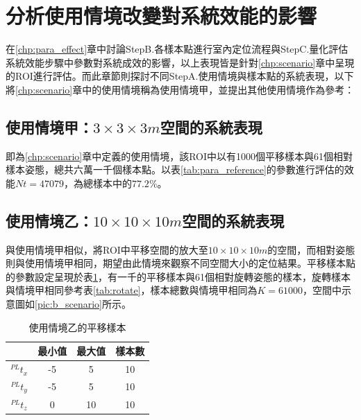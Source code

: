 \section{分析使用情境改變對系統效能的影響}
\label{chp:scene_effect}
在\ref{chp:para_effect}章中討論StepB.各樣本點進行室內定位流程與StepC.量化評估系統效能步驟中參數對系統成效的影響，以上表現皆是針對\ref{chp:scenario}章中呈現的ROI進行評估。而此章節則探討不同StepA.使用情境與樣本點的系統表現，以下將\ref{chp:scenario}章中的使用情境稱為使用情境甲，並提出其他使用情境作為參考：

\subsection{使用情境甲：$3\times 3\times 3m$空間的系統表現}
\label{chp:scene_A}

即為\ref{chp:scenario}章中定義的使用情境，該ROI中以有1000個平移樣本與61個相對樣本姿態，總共六萬一千個樣本點。以表\ref{tab:para_reference}的參數進行評估的效能$Nt=47079$，為總樣本中的$77.2\%$。

\subsection{使用情境乙：$10\times 10\times 10m$空間的系統表現}
\label{chp:scene_B}

與使用情境甲相似，將ROI中平移空間的放大至$10\times 10\times 10m$的空間，而相對姿態則與使用情境甲相同，期望由此情境來觀察不同空間大小的定位結果。平移樣本點的參數設定呈現於表\ref{tab:B_translate}，有一千的平移樣本與61個相對旋轉姿態的樣本，旋轉樣本與情境甲相同參考表\ref{tab:rotate}，樣本總數與情境甲相同為$K=61000$，空間中示意圖如\ref{pic:b_scenario}所示。

\begin{table}[htpb]
    \begin{center}
      \caption{使用情境乙的平移樣本}
      \label{tab:B_translate}
      \begin{tabular}{c|c|c|c} %
         & \textbf{最小值} & \textbf{最大值}&\textbf{樣本數}\\
        \hline
        $^{PL}t_x$ & -5 & 5&10\\
        $^{PL}t_y$ & -5 & 5&10\\
        $^{PL}t_z$ & 0 & 10 &10\\
      \end{tabular}
    \end{center}
  \end{table}


